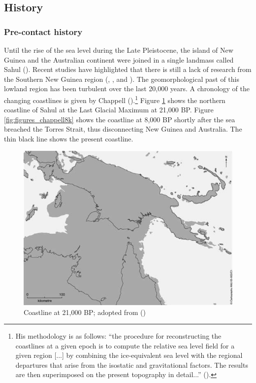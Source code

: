 \subsection{History}\label{history}

\subsubsection{Pre-contact history}\label{prehistory}

Until the rise of the sea level during the Late Pleistocene, the island of New Guinea and the Australian continent were joined in a single landmass called Sahul (\citealt{White:1982prehist}). Recent studies have highlighted that there is still a lack of research from the Southern New Guinea region (\citealt{Pawley:2005ue}, \citealt{Ballard:2010cd}, and \citealt{Evans:2012wp}). The geomorphological past of this lowland region has been turbulent over the last 20,000 years. A chronology of the changing coastlines is given by Chappell (\citeyear{Chappell:2005coastal}).\footnote{His methodology is as follows: ``the procedure for reconstructing the coastlines at a given epoch is to compute the relative sea level field for a given region [...] by combining the ice-equivalent sea level with the regional departures that arise from the isostatic and gravitational factors. The results are then superimposed on the present topography in detail...'' (\citeyear[529]{Chappell:2005coastal}).} Figure \ref{fig:figures_chappell21k} shows the northern coastline of Sahul at the Last Glacial Maximum at 21,000 BP. Figure \ref{fig:figures_chappell8k} shows the coastline at 8,000 BP shortly after the sea breached the Torres Strait, thus disconnecting New Guinea and Australia. The thin black line shows the present coastline.

\begin{figure}
  
    \includegraphics[width=.6\textwidth]{figures/chappell21k.png}
  \caption[Coastline at 21,000 BP]{Coastline at 21,000 BP; adopted from (\citealt[527]{Chappell:2005coastal})}
  \label{fig:figures_chappell21k}
\end{figure}

